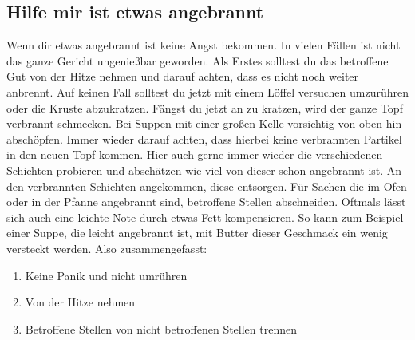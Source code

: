 \subsection{Hilfe mir ist etwas angebrannt}\label{subsec:hilfe-mir-ist-etwas-angebrannt}
Wenn dir etwas angebrannt ist keine Angst bekommen.
In vielen Fällen ist nicht das ganze Gericht ungenießbar geworden.
Als Erstes solltest du das betroffene Gut von der Hitze nehmen und darauf achten, dass es nicht noch weiter anbrennt.
Auf keinen Fall solltest du jetzt mit einem Löffel versuchen umzurühren oder die Kruste abzukratzen.
Fängst du jetzt an zu kratzen, wird der ganze Topf verbrannt schmecken.
Bei Suppen mit einer großen Kelle vorsichtig von oben hin abschöpfen.
Immer wieder darauf achten, dass hierbei keine verbrannten Partikel in den neuen Topf kommen.
Hier auch gerne immer wieder die verschiedenen Schichten probieren und abschätzen wie viel von dieser schon angebrannt ist.
An den verbrannten Schichten angekommen, diese entsorgen.
Für Sachen die im Ofen oder in der Pfanne angebrannt sind, betroffene Stellen abschneiden.
Oftmals lässt sich auch eine leichte Note durch etwas Fett kompensieren.
So kann zum Beispiel einer Suppe, die leicht angebrannt ist, mit Butter dieser Geschmack ein wenig \glqq versteckt \grqq{} werden.
Also zusammengefasst:
\begin{enumerate}
    \item Keine Panik und nicht umrühren
    \item Von der Hitze nehmen
    \item Betroffene Stellen von nicht betroffenen Stellen trennen
\end{enumerate}
